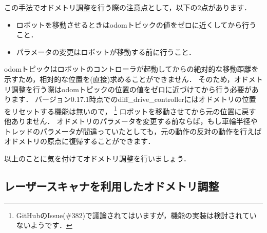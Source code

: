 \documentclass[{../../master}]{subfiles}
\begin{document}
この手法でオドメトリ調整を行う際の注意点として，以下の2点があります．

\begin{itemize}
  \item ロボットを移動させるときは\textsf{odom}トピックの値をゼロに近くしてから行うこと．
  \item パラメータの変更はロボットが移動する前に行うこと．
\end{itemize}

\textsf{odom}トピックはロボットのコントローラが起動してからの絶対的な移動距離を示すため，相対的な位置を(直接)求めることができません．
そのため，オドメトリ調整を行う際は\textsf{odom}トピックの位置の値をゼロに近づけてから行う必要があります．
バージョン0.17.1時点での\textsf{diff\_drive\_controller}にはオドメトリの位置をリセットする機能は無いので，
\footnote{GitHubのIssue(\#382)で議論されてはいますが，機能の実装は検討されていないようです．}
ロボットを移動させてから元の位置に戻す他ありません．
オドメトリのパラメータを変更する前ならば，もし車輪半径やトレッドのパラメータが間違っていたとしても，元の動作の反対の動作を行えばオドメトリの原点に復帰することができます．

以上のことに気を付けてオドメトリ調整を行いましょう．

\subsection{レーザースキャナを利用したオドメトリ調整}
\end{document}
